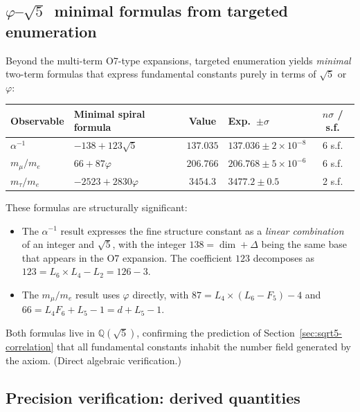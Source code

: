 \documentclass[12pt,a4paper]{article}
\begin{document}
\subsection{$\varphi$--$\sqrt{5}$~minimal formulas from targeted enumeration}
\label{sec:minimal-formulas}

Beyond the multi-term O7-type expansions, targeted enumeration yields \emph{minimal} two-term formulas that express fundamental constants purely in terms of $\sqrt{5}$ or $\varphi$:

\begin{center}
\begin{tabular}{|l|l|c|l|c|}
\hline
\textbf{Observable} & \textbf{Minimal spiral formula} & \textbf{Value} & \textbf{Exp.\ $\pm\sigma$} & $n\sigma$ / s.f. \\
\hline
$\alpha^{-1}$ & $-138 + 123\sqrt{5}$ & $137.035$ & $137.036 \pm 2{\times}10^{-8}$ & 6 s.f. \\
$m_\mu/m_e$ & $66 + 87\varphi$ & $206.766$ & $206.768 \pm 5{\times}10^{-6}$ & 6 s.f. \\
$m_\tau/m_e$ & $-2523 + 2830\varphi$ & $3454.3$ & $3477.2 \pm 0.5$ & 2 s.f. \\
\hline
\end{tabular}
\end{center}
These formulas are structurally significant:
\begin{itemize}
\item The $\alpha^{-1}$ result expresses the fine structure constant as a \emph{linear combination} of an integer and $\sqrt{5}$, with the integer $138 = \dim + \Delta$ being the same base that appears in the O7 expansion. The coefficient $123$ decomposes as $123 = L_6 \times L_4 - L_2 = 126 - 3$.
\item The $m_\mu/m_e$ result uses $\varphi$ directly, with $87 = L_4 \times (L_6{-}F_5) - 4$ and $66 = L_4 F_6 + L_5 - 1 = d + L_5 - 1$.
\end{itemize}
Both formulas live in $\mathbb{Q}(\sqrt{5})$, confirming the prediction of Section~\ref{sec:sqrt5-correlation} that all fundamental constants inhabit the number field generated by the axiom. (Direct algebraic verification.)



\subsection{Precision verification: derived quantities}
\label{sec:precision}
\end{document}
